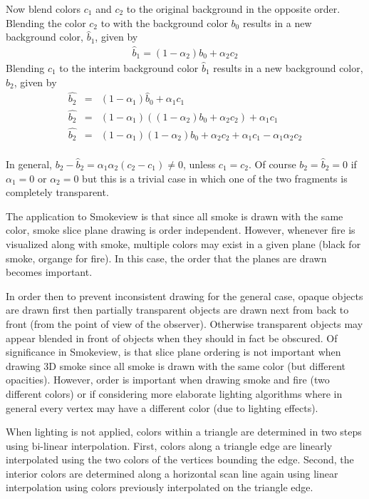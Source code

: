 \documentclass[11pt,twoside]{book}
\begin{document}
Now blend colors $c_1$ and $c_2$ to the original background in the opposite order.
Blending the color $c_2$ to with the background color $b_0$ results in a new background color, $\hat{b}_1$, given by
\begin{eqnarray*}
\hat{b}_1=(1-\alpha_2)b_0 + \alpha_2c_2
\end{eqnarray*}
Blending $c_1$ to the interim background color $\hat{b}_1$ results in a new background color, $\hat{b}_2$, given by
\begin{eqnarray*}
\hat{b_2}&=&(1-\alpha_1)\hat{b}_0+\alpha_1c_1\\
\hat{b_2}&=&(1-\alpha_1)((1-\alpha_2)b_0 + \alpha_2c_2)+\alpha_1c_1\\
\hat{b_2}&=&(1-\alpha_1)(1-\alpha_2)b_0 + \alpha_2c_2 + \alpha_1c_1 - \alpha_1\alpha_2c_2\\
\end{eqnarray*}


In general, $b_2-\hat{b}_2=\alpha_1\alpha_2(c_2-c_1)\ne 0$, unless $c_1=c_2$.  Of course $b_2=\hat{b}_2=0$ if $\alpha_1=0$ or $\alpha_2=0$ but this is a trivial case in which one of the two fragments is completely transparent.

The application to Smokeview is that since all smoke is drawn with the same color, smoke slice plane drawing is order independent.  However, whenever fire is visualized along with smoke, multiple colors may exist in a given plane (black for smoke, organge for fire).  In this case, the order that the planes are drawn becomes important.

In order then to prevent inconsistent drawing for the general case, opaque
objects are drawn first then partially transparent objects
are drawn next from back to front (from the point of view of
the observer). Otherwise transparent objects may appear blended in
front of objects when they should in fact be obscured.
Of significance in Smokeview, is that slice plane ordering is not important when drawing 3D smoke since all smoke is drawn with the same color (but different opacities).  However, order is important when drawing smoke and fire (two different colors) or if considering more elaborate lighting algorithms where in general every vertex may have a different color (due to lighting effects).

When lighting is not applied, colors within a triangle are
determined in two steps using bi-linear interpolation. First,
colors along a triangle edge are linearly interpolated using the
two colors of the vertices bounding the edge. Second, the interior
colors are determined along a horizontal scan line again using
linear interpolation using colors previously interpolated on the
triangle edge.
\end{document}
